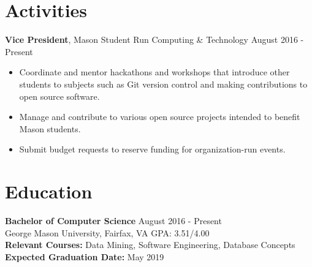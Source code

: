\documentclass[11pt]{res} %
\begin{document}
\begin{resume}
\vspace{-15pt}
\noindent\makebox[\linewidth]{\rule{\textwidth}{1pt}}


\vspace{-10pt}\section{\LARGE Activities} \smallskip

\textbf{Vice President}, Mason Student Run Computing \& Technology \hfill August 2016 - Present\smallskip
\begin{itemize}
\item Coordinate and mentor hackathons and workshops that introduce other students to subjects such as Git version control and making contributions to open source software.
\item Manage and contribute to various open source projects intended to benefit Mason students.
\item Submit budget requests to reserve funding for organization-run events.
\end{itemize}

\vspace{-15pt}
\noindent\makebox[\linewidth]{\rule{\textwidth}{1pt}}


\vspace{-10pt}\section{\LARGE Education} \smallskip

\textbf{Bachelor of Computer Science}  \hfill August 2016 - Present\\
\medskip
George Mason University, Fairfax, VA \hfill GPA: 3.51/4.00\\
\textbf{Relevant Courses:} Data Mining, Software Engineering, Database Concepts\\
\textbf{Expected Graduation Date:} May 2019


\end{resume}
\end{document}
